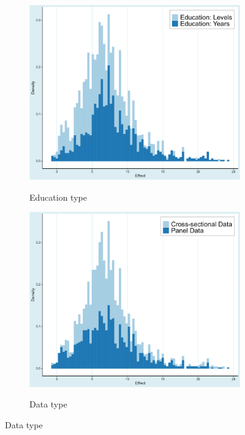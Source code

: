 \begin{figure}[!htbp]
\begin{center}
\caption{Graphically observing the effect across subsets of data}
\label{fig:prima_facie}

\begin{subfigure}[!htbp]{0.38\textwidth}
   \vspace{-0.1cm}
   \caption{Education type}
   \vspace{-0.1cm}
   \includegraphics[width=0.95\linewidth]{Figures/Prima Facie/prima_facie_years_levels.png}
   \label{fig:prima_facie_years_levels}
\end{subfigure}
\begin{subfigure}[!htbp]{0.38\textwidth}
   \vspace{-0.1cm}
   \caption{Data type}
   \vspace{-0.1cm}
   \includegraphics[width=0.95\linewidth]{Figures/Prima Facie/prima_facie_data_type.png}
   \label{fig:prima_facie_data_type}
\end{subfigure}


\end{center}
\end{figure}
